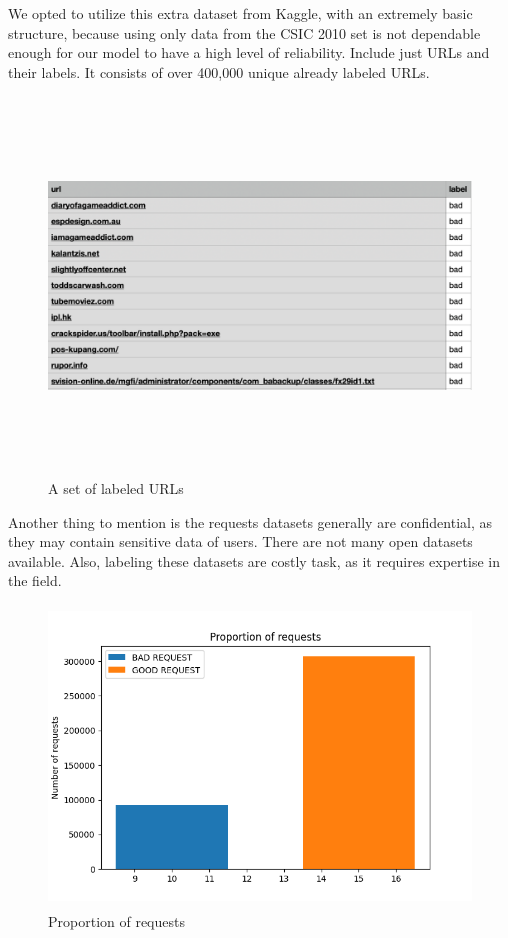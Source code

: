 \hspace{0.5cm}We opted to utilize this extra dataset from Kaggle, with an extremely basic structure, because using only data from the CSIC 2010 set is not dependable enough for our model to have a high level of reliability. Include just URLs and their labels. It consists of over 400,000 unique already labeled URLs.
\begin{figure}[!h]
	\centering
	\includegraphics[width=\linewidth, height=10cm,keepaspectratio]{figures/dataset3.png}
  \caption{A set of labeled URLs}
\end{figure}

Another thing to mention is the requests datasets generally are confidential, as they may contain sensitive data of users. There are not many open datasets available. Also, labeling these datasets are costly task, as it requires expertise in the field.

\begin{figure}[!h]
	\centering
	\includegraphics[width=\linewidth, height=8cm,keepaspectratio]{figures/proportion.png} 
  \caption{Proportion of requests}
\end{figure}


